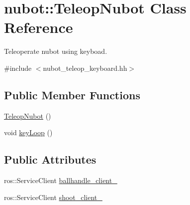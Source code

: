 \hypertarget{classnubot_1_1TeleopNubot}{\section{nubot\-:\-:Teleop\-Nubot Class Reference}
\label{classnubot_1_1TeleopNubot}
}


Teleoperate nubot using keyboad.  




{\ttfamily \#include $<$nubot\-\_\-teleop\-\_\-keyboard.\-hh$>$}

\subsection*{Public Member Functions}
\begin{DoxyCompactItemize}
\item 
\hyperlink{classnubot_1_1TeleopNubot_a02ac1e7e03d529b402ce8cee2a5e471c}{Teleop\-Nubot} ()
\item 
void \hyperlink{classnubot_1_1TeleopNubot_a4a87d58343f798bf151b5e6fc86dba80}{key\-Loop} ()
\end{DoxyCompactItemize}
\subsection*{Public Attributes}
\begin{DoxyCompactItemize}
\item 
ros\-::\-Service\-Client \hyperlink{classnubot_1_1TeleopNubot_aa2e697fc90b7891b53a8def6d0fb6348}{ballhandle\-\_\-client\-\_\-}
\item 
ros\-::\-Service\-Client \hyperlink{classnubot_1_1TeleopNubot_a6c44cfc75edcdaab50a1c7c8ae32b2ae}{shoot\-\_\-client\-\_\-}
\end{DoxyCompactItemize}
